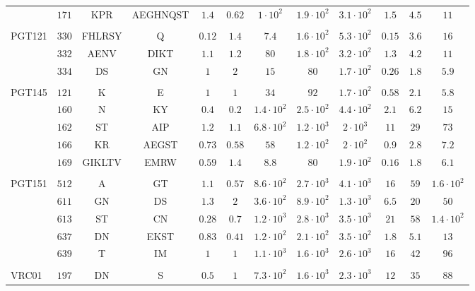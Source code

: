 \documentclass[11pt]{article}
\begin{document}
\begin{table*}[h!]
{\begin{tabular}{lc|cc|cc|ccc|ccc}
 & $171$ & KPR & AEGHNQST & $1.4$ & $0.62$ & $1 \cdot 10^{2}$ & $1.9 \cdot 10^{2}$ & $3.1 \cdot 10^{2}$ & $1.5$ & $4.5$ & $11$\\
\\
\multirow{3}{*}{PGT121}
 & $330$ & FHLRSY & Q & $0.12$ & $1.4$ & $7.4$ & $1.6 \cdot 10^{2}$ & $5.3 \cdot 10^{2}$ & $0.15$ & $3.6$ & $16$\\
 & $332$ & AENV & DIKT & $1.1$ & $1.2$ & $80$ & $1.8 \cdot 10^{2}$ & $3.2 \cdot 10^{2}$ & $1.3$ & $4.2$ & $11$\\
 & $334$ & DS & GN & $1$ & $2$ & $15$ & $80$ & $1.7 \cdot 10^{2}$ & $0.26$ & $1.8$ & $5.9$\\
\\
\multirow{5}{*}{PGT145}
 & $121$ & K & E & $1$ & $1$ & $34$ & $92$ & $1.7 \cdot 10^{2}$ & $0.58$ & $2.1$ & $5.8$\\
 & $160$ & N & KY & $0.4$ & $0.2$ & $1.4 \cdot 10^{2}$ & $2.5 \cdot 10^{2}$ & $4.4 \cdot 10^{2}$ & $2.1$ & $6.2$ & $15$\\
 & $162$ & ST & AIP & $1.2$ & $1.1$ & $6.8 \cdot 10^{2}$ & $1.2 \cdot 10^{3}$ & $2 \cdot 10^{3}$ & $11$ & $29$ & $73$\\
 & $166$ & KR & AEGST & $0.73$ & $0.58$ & $58$ & $1.2 \cdot 10^{2}$ & $2 \cdot 10^{2}$ & $0.9$ & $2.8$ & $7.2$\\
 & $169$ & GIKLTV & EMRW & $0.59$ & $1.4$ & $8.8$ & $80$ & $1.9 \cdot 10^{2}$ & $0.16$ & $1.8$ & $6.1$\\
\\
\multirow{5}{*}{PGT151}
 & $512$ & A & GT & $1.1$ & $0.57$ & $8.6 \cdot 10^{2}$ & $2.7 \cdot 10^{3}$ & $4.1 \cdot 10^{3}$ & $16$ & $59$ & $1.6 \cdot 10^{2}$\\
 & $611$ & GN & DS & $1.3$ & $2$ & $3.6 \cdot 10^{2}$ & $8.9 \cdot 10^{2}$ & $1.3 \cdot 10^{3}$ & $6.5$ & $20$ & $50$\\
 & $613$ & ST & CN & $0.28$ & $0.7$ & $1.2 \cdot 10^{3}$ & $2.8 \cdot 10^{3}$ & $3.5 \cdot 10^{3}$ & $21$ & $58$ & $1.4 \cdot 10^{2}$\\
 & $637$ & DN & EKST & $0.83$ & $0.41$ & $1.2 \cdot 10^{2}$ & $2.1 \cdot 10^{2}$ & $3.5 \cdot 10^{2}$ & $1.8$ & $5.1$ & $13$\\
 & $639$ & T & IM & $1$ & $1$ & $1.1 \cdot 10^{3}$ & $1.6 \cdot 10^{3}$ & $2.6 \cdot 10^{3}$ & $16$ & $42$ & $96$\\
\\
\multirow{5}{*}{VRC01}
 & $197$ & DN & S & $0.5$ & $1$ & $7.3 \cdot 10^{2}$ & $1.6 \cdot 10^{3}$ & $2.3 \cdot 10^{3}$ & $12$ & $35$ & $88$\\

\end{tabular}}
\end{table*}
\end{document}
